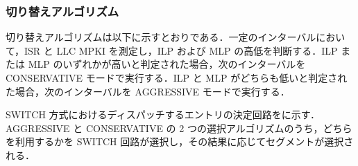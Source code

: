 \subsubsection{切り替えアルゴリズム}
切り替えアルゴリズムは以下に示すとおりである．一定のインターバルにおいて，ISR と LLC MPKI を測定し，ILP および MLP の高低を判断する．ILP または MLP のいずれかが高いと判定された場合，次のインターバルを CONSERVATIVE モードで実行する．ILP と MLP がどちらも低いと判定された場合，次のインターバルを AGGRESSIVE モードで実行する．

SWITCH 方式におけるディスパッチするエントリの決定回路をに示す．AGGRESSIVE と CONSERVATIVE の 2 つの選択アルゴリズムのうち，どちらを利用するかを SWITCH 回路が選択し，その結果に応じてセグメントが選択される．
